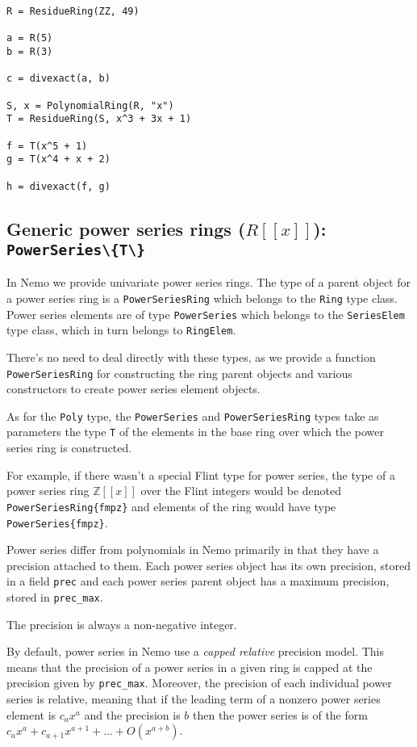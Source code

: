 \documentclass[a4paper,10pt]{article}
\newcommand{\Z}{\mathbb{Z}}
\newcommand{\code}{\lstinline}
\begin{document}
\begin{lstlisting}
R = ResidueRing(ZZ, 49)

a = R(5)
b = R(3)

c = divexact(a, b)

S, x = PolynomialRing(R, "x")
T = ResidueRing(S, x^3 + 3x + 1)

f = T(x^5 + 1)
g = T(x^4 + x + 2)

h = divexact(f, g)
\end{lstlisting}

\subsection{Generic power series rings ($R[[x]]$): \code|PowerSeries\{T\}|}

In Nemo we provide univariate power series rings. The type of a parent object for
a power series ring is a \code{PowerSeriesRing} which belongs to the \code{Ring}
type class. Power series elements are of type \code{PowerSeries} which belongs to
the \code{SeriesElem} type class, which in turn belongs to \code{RingElem}.

There's no need to deal directly with these types, as we provide a function
\code{PowerSeriesRing} for constructing the ring parent objects and various
constructors to create power series element objects.

As for the \code{Poly} type, the \code{PowerSeries} and \code{PowerSeriesRing}
types take as parameters the type \code{T} of the elements in the base ring
over which the power series ring is constructed.

For example, if there wasn't a special Flint type for power series, the type of
a power series ring $\Z[[x]]$ over the Flint integers would be denoted
\code|PowerSeriesRing{fmpz}| and elements of the ring would have type
\code|PowerSeries{fmpz}|.

Power series differ from polynomials in Nemo primarily in that they have a
precision attached to them. Each power series object has its own precision,
stored in a field \code{prec} and each power series parent object has a
maximum precision, stored in \code{prec_max}.

The precision is always a non-negative integer.

By default, power series in Nemo use a \emph{capped relative} precision model.
This means that the precision of a power series in a given ring is capped at
the precision given by \code{prec_max}. Moreover, the precision of each 
individual power series is relative, meaning that if the leading term of
a nonzero power series element is $c_ax^a$ and the precision is $b$ then the
power series is of the form $c_ax^a + c_{a+1}x^{a+1} + \ldots + O(x^{a + b})$.
\end{document}
